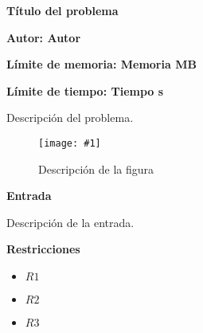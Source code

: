 \documentclass{article}
\newenvironment{ConstraintList}
{
	\vspace{-2mm}
	\begin{itemize}
}
{
	\end{itemize}
}
\newcommand{\spanishProblemHeader}[4]{
	\begin{center} {\huge \sf \bfseries #1} \end{center}
	\vspace{-2mm}
	\centerline{\sf \bfseries Autor: #2}
	\vspace{1mm}
	\centerline{\sf \bfseries Límite de memoria: #3}
	\vspace{1mm}
	\centerline{\sf \bfseries Límite de tiempo: #4}
	\vspace{10mm}
}
\newcommand{\printSubtitle}[1]{
	\vspace{1mm}
	\begin{flushleft} {\Large \sf \bfseries #1 \newline} \end{flushleft}
	\vspace{-4mm}
}
\newcommand{\image}[4]{
	\begin{figure}[h]
		\centering
		\texttt{[image: \#1]}
		\caption{#4}
	\end{figure}
}
\begin{document}


\spanishProblemHeader{Título del problema}{Autor}{Memoria MB}{Tiempo s}




Descripción del problema.
\newline

\image{images/figure-1.png}{9.6cm}{8cm}{Descripción de la figura}




\printSubtitle{Entrada}

Descripción de la entrada.
\newline




\printSubtitle{Restricciones}

\begin{ConstraintList}
	\item $ R1 $
	\item $ R2 $
	\item $ R3 $
\end{ConstraintList}
\end{document}
